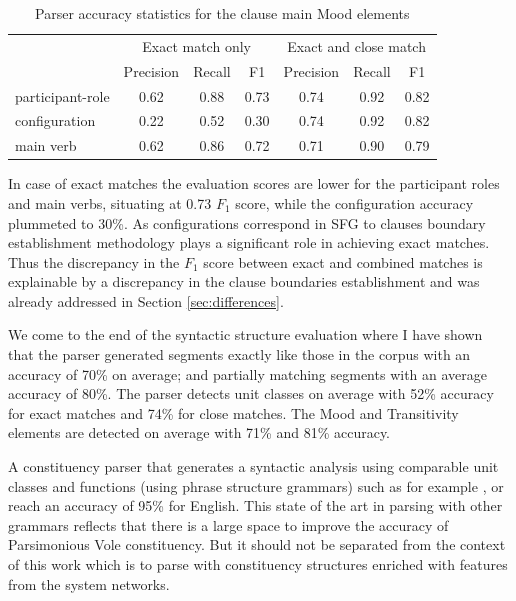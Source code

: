     \begin{table}[!ht]
    \centering
    \begin{tabular}{lcccccc}
    \toprule
     & \multicolumn{3}{c}{Exact match only} & \multicolumn{3}{c}{Exact and close match} \\ \cline{2-7} 
     & Precision & Recall & F1 & Precision & Recall & F1 \\ 
    \midrule
    participant-role &       0.62 &    0.88 & 0.73 &       0.74 &    0.92 & 0.82 \\
    configuration    &       0.22 &    0.52 & 0.30 &       0.74 &    0.92 & 0.82 \\
    main verb        &       0.62 &    0.86 & 0.72 &       0.71 &    0.90 & 0.79 \\ 
    \bottomrule
    \end{tabular}
    \caption{Parser accuracy statistics for the clause main Mood elements}
    \label{tab:unit-elements-transitivity-combined-F1}
    \end{table}
    
    In case of exact matches the evaluation scores are lower for the participant roles and main verbs, situating at 0.73 $F_1$ score, while the configuration accuracy plummeted to 30\%. As configurations correspond in SFG to clauses boundary establishment methodology plays a significant role in achieving exact matches. Thus the discrepancy in the $F_1$ score between exact and combined matches is explainable by a discrepancy in the clause boundaries establishment and was already addressed in Section \ref{sec:differences}. 
    
    We come to the end of the syntactic structure evaluation where I have shown that the parser generated segments exactly like those in the corpus with an accuracy of 70\% on average; and partially matching segments with an average accuracy of 80\%. The parser detects unit classes on average with 52\% accuracy for exact matches and 74\% for close matches. The Mood and Transitivity elements are detected on average with 71\% and 81\% accuracy. 
    
    A constituency parser that generates a syntactic analysis using comparable unit classes and functions (using phrase structure grammars) such as for example \citet{chen2014fast}, \citet{stern2017minimal} or \citet{kitaev2018multilingual} reach an accuracy of 95\% for English. This state of the art in parsing with other grammars reflects that there is a large space to improve the accuracy of Parsimonious Vole constituency. But it should not be separated from the context of this work which is to parse with constituency structures enriched with features from the system networks. %
    

